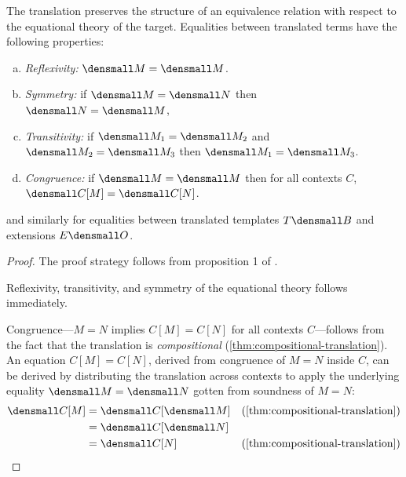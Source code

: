\begin{lemma}
  \label{thm:equivalence-relation}

  The translation preserves the structure of an equivalence relation with respect to the equational theory of the target.
  Equalities between translated terms have the following properties:
  \begin{enumerate}[(a)]
  \item \emph{Reflexivity:} $\den{M} = \den{M}$.
  \item \emph{Symmetry:} if $\den{M} = \den{N}$ then $\den{N} = \den{M}$,
  \item \emph{Transitivity:} if $\den{M_1} = \den{M_2}$ and $\den{M_2} = \den{M_3}$ then $\den{M_1} = \den{M_3}$.
  \item \emph{Congruence:} if $\den{M} = \den{M}$ then for all contexts $C$, $\den{C[M]} = \den{C[N]}$.
  \end{enumerate}
  and similarly for equalities between translated templates $T\den{B}$ and extensions $E\den{O}$.
\end{lemma}
\begin{proof}
  The proof strategy follows from proposition 1 of \cite{DownenAriola2014CSCC}.
  
  Reflexivity, transitivity, and symmetry of the equational theory follows immediately.

  Congruence---$M = N$ implies $C[M] = C[N]$ for all contexts $C$---follows from
  the fact that the translation is \emph{compositional}
  (\cref{thm:compositional-translation}).  An equation $C[M] = C[N]$, derived
  from congruence of $M = N$ inside $C$, can be derived by distributing the
  translation across contexts to apply the underlying equality
  $\den{M} = \den{N}$ gotten from soundness of $M = N$:
  \begin{align*}
    \den{C[M]}
    &=
    \den{C}{[\den{M}]}
    &(\cref{thm:compositional-translation})
    \\
    &=
    \den{C}{[\den{N}]}
    \\
    &=
    \den{C[N]}
    &(\cref{thm:compositional-translation})
  \end{align*}
\end{proof}

